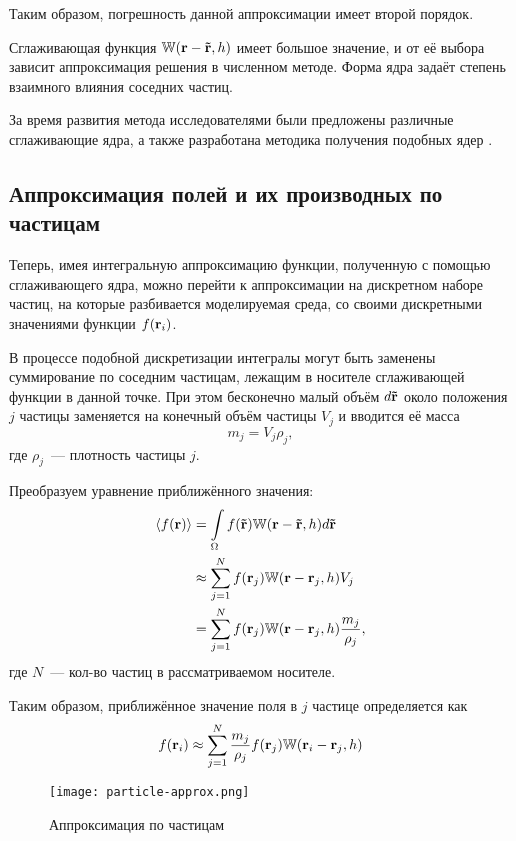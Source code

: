 Таким образом, погрешность данной аппроксимации имеет второй порядок.

Сглаживающая функция $\mathbb W(\boldsymbol{\mathbf{r}}-\boldsymbol{\mathbf{\tilde r}}, h)$ имеет большое значение, и от её выбора зависит аппроксимация решения в численном методе. Форма ядра задаёт степень взаимного влияния соседних частиц.

За время развития метода исследователями были предложены различные сглаживающие ядра, а также разработана методика получения подобных ядер \cite{liu}.


\subsection{Аппроксимация полей и их производных по частицам}
Теперь, имея интегральную аппроксимацию функции, полученную с помощью сглаживающего ядра, можно перейти к аппроксимации на дискретном наборе частиц, на которые разбивается моделируемая среда, со своими дискретными значениями функции $f(\boldsymbol{\mathbf{r}}_i)$.

В процессе подобной дискретизации интегралы могут быть заменены суммирование по соседним частицам, лежащим в носителе сглаживающей функции в данной точке. При этом бесконечно малый объём $d\boldsymbol{\mathbf{\tilde r}}$ около положения $j$ частицы заменяется на конечный объём частицы $V_j$ и вводится её масса
\begin{equation}
  m_j=V_j\rho_j,
\end{equation}
где $\rho_j$~--- плотность частицы $j$.

Преобразуем уравнение приближённого значения:
\begin{align*}
  \langle f(\boldsymbol{\mathbf{r}})\rangle&=\int\limits_\Omega f(\boldsymbol{\mathbf{\tilde r}})\mathbb W(\boldsymbol{\mathbf{r}}-\boldsymbol{\mathbf{\tilde r}}, h)d\boldsymbol{\mathbf{\tilde r}}\\
  &\approx\sum_{j=1}^N f(\boldsymbol{\mathbf{r}}_j)\mathbb W(\boldsymbol{\mathbf{r}}-\boldsymbol{\mathbf{r}}_j, h)V_j\\
  &=\sum_{j=1}^N f(\boldsymbol{\mathbf{r}}_j)\mathbb W(\boldsymbol{\mathbf{r}}-\boldsymbol{\mathbf{r}}_j, h)\frac{m_j}{\rho_j},
\end{align*}
где $N$~--- кол-во частиц в рассматриваемом носителе.

Таким образом, приближённое значение поля в $j$ частице определяется как
\begin{equation} \label{eq:approx-f}
  f(\boldsymbol{\mathbf{r}}_i)\approx\sum_{j=1}^N\frac{m_j}{\rho_j}f(\boldsymbol{\mathbf{r}}_j)\mathbb W(\boldsymbol{\mathbf{r}}_i-\boldsymbol{\mathbf{r}}_j, h)
\end{equation}

\begin{figure}[h]
  \centering
  \texttt{[image: particle-approx.png]}
  \caption{Аппроксимация по частицам}
\end{figure}

